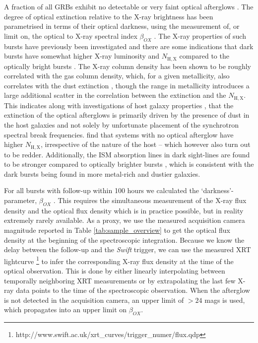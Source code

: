 \documentclass[longauth]{aa}    %
\begin{document}
A fraction of all GRBs exhibit no detectable or very faint optical afterglows
\citep{Groot1998, Djorgovski2001, Fynbo2001}. The degree of optical extinction
relative to the X-ray brightness has been parametrised in terms of their optical
darkness, using the measurement of, or limit on, the optical to X-ray spectral
index $\beta_{OX}$ \citep{Jakobsson2004, Rol2005, VanderHorst2009}. The X-ray
properties of such bursts have previously been investigated
\citep{DePasquale2003, Fynbo2009, Melandri2012} and there are some indications
that dark bursts have somewhat higher X-ray luminosity and $N_{\mathrm{H, X}}$
compared to the optically bright bursts \citep{Campana2012, Watson2012}. The
X-ray column density has been shown to be roughly correlated with the gas column
density, which, for a given metallicity, also correlates with the dust
extinction \citep{Watson2013, Covino2013a}, though the range in metallicity
introduces a large additional scatter in the correlation between the extinction
and the $N_{\mathrm{H, X}}$. This indicates along with investigations of host
galaxy properties \citep{Greiner2011, Kruhler2011, Hjorth2012, Perley2016b},
that the extinction of the optical afterglows is primarily driven by the
presence of dust in the host galaxies and not solely by unfortunate placement of
the synchrotron spectral break frequencies. \citet{Hjorth2012} find that systems
with no optical afterglow have higher $N_{\mathrm{H, X}}$, irrespective of the
nature of the host -- which however also turn out to be redder. Additionally,
the ISM absorption lines in dark sight-lines are found to be stronger compared
to optically brighter bursts \citep{Christensen2011a}, which is consistent with
the dark bursts being found in more metal-rich and dustier galaxies.

For all bursts with follow-up within 100 hours we calculated the `darkness'-parameter, $\beta_{OX}$ \citep{Jakobsson2004}. This requires the
simultaneous measurement of the X-ray flux density and the optical flux density
which is in practice possible, but in reality extremely rarely available. As
a proxy, we use the measured acquisition camera magnitude reported in Table
\ref{tab:sample_overview} to get the optical flux density at the beginning of
the spectroscopic integration. Because we know the delay between the follow-up
and the \textit{Swift} trigger, we can use the measured XRT lightcurve
\citep{Evans2007,
	Evans2009}\footnote{http://www.swift.ac.uk/xrt\_curves/trigger\_numer/flux.qdp}
to infer the corresponding X-ray flux density at the time of the optical
observation. This is done by either linearly interpolating between temporally
neighboring XRT measurements or by extrapolating the last few X-ray data points
to the time of the spectroscopic observation. When the afterglow is not detected
in the acquisition camera, an upper limit of $> 24$ mags is used, which
propagates into an upper limit on $\beta_{OX}$.
\end{document}
